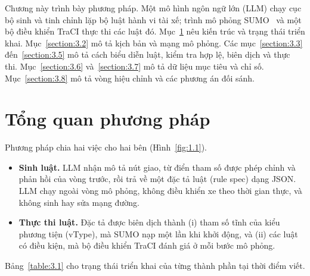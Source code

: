 \documentclass[../DoAn.tex]{subfiles}
\begin{document}

Chương này trình bày phương pháp. Một mô hình ngôn ngữ lớn (LLM) chạy cục bộ sinh và tinh chỉnh lặp bộ luật hành vi tài xế; trình mô phỏng SUMO~\cite{lopez2018sumo} và một bộ điều khiển TraCI thực thi các luật đó. Mục~\ref{section:3.1} nêu kiến trúc và trạng thái triển khai. Mục~\ref{section:3.2} mô tả kịch bản và mạng mô phỏng. Các mục~\ref{section:3.3} đến~\ref{section:3.5} mô tả cách biểu diễn luật, kiểm tra hợp lệ, biên dịch và thực thi. Mục~\ref{section:3.6} và~\ref{section:3.7} mô tả dữ liệu mục tiêu và chỉ số. Mục~\ref{section:3.8} mô tả vòng hiệu chỉnh và các phương án đối sánh.

\section{Tổng quan phương pháp}
\label{section:3.1}

Phương pháp chia hai việc cho hai bên (Hình~\ref{fig:1.1}).
\begin{itemize}
    \item \textbf{Sinh luật.} LLM nhận mô tả nút giao, từ điển tham số được phép chỉnh và phản hồi của vòng trước, rồi trả về một đặc tả luật (rule spec) dạng JSON. LLM chạy ngoài vòng mô phỏng, không điều khiển xe theo thời gian thực, và không sinh hay sửa mạng đường.
    \item \textbf{Thực thi luật.} Đặc tả được biên dịch thành (i) tham số tĩnh của kiểu phương tiện (vType), mà SUMO nạp một lần khi khởi động, và (ii) các luật có điều kiện, mà bộ điều khiển TraCI đánh giá ở mỗi bước mô phỏng.
\end{itemize}
Bảng~\ref{table:3.1} cho trạng thái triển khai của từng thành phần tại thời điểm viết.
\end{document}
